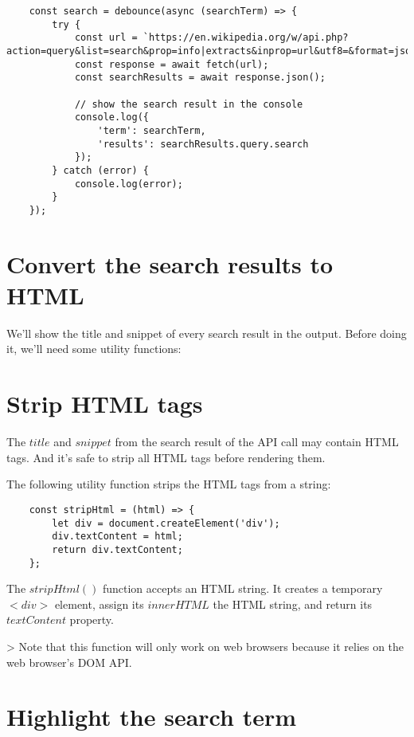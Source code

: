 \documentclass[11pt]{article}
\begin{document}
\begin{lstlisting}
    const search = debounce(async (searchTerm) => {
        try {
            const url = `https://en.wikipedia.org/w/api.php?action=query&list=search&prop=info|extracts&inprop=url&utf8=&format=json&origin=*&srlimit=10&srsearch=${searchTerm}`;
            const response = await fetch(url);
            const searchResults = await response.json();

            // show the search result in the console
            console.log({
                'term': searchTerm,
                'results': searchResults.query.search
            });
        } catch (error) {
            console.log(error);
        }
    });
\end{lstlisting}

\section*{Convert the search results to HTML}

We'll show the title and snippet of every search result in the output.
Before doing it, we'll need some utility functions:

\section*{Strip HTML tags}

The $title$ and $snippet$ from the search result of the API call may
contain HTML tags. And it's safe to strip all HTML tags
before rendering them.

The following utility function strips the HTML tags from a string:

\begin{lstlisting}
    const stripHtml = (html) => {
        let div = document.createElement('div');
        div.textContent = html;
        return div.textContent;
    };
\end{lstlisting}

The $stripHtml()$ function accepts an HTML string. It creates a
temporary $<div>$ element, assign its $innerHTML$ the HTML string,
and return its $textContent$ property.

> Note that this function will only work on web browsers because it
relies on the web browser's DOM API.

\section*{Highlight the search term}
\end{document}
